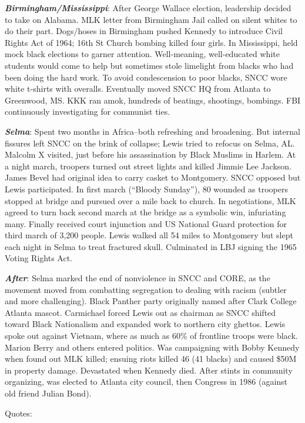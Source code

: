 \documentclass[
]{article}
\begin{document}
\textbf{\emph{Birmingham/Mississippi}}: After George Wallace election,
leadership decided to take on Alabama. MLK letter from Birmingham Jail
called on silent whites to do their part. Dogs/hoses in Birmingham
pushed Kennedy to introduce Civil Rights Act of 1964; 16th St Church
bombing killed four girls. In Mississippi, held mock black elections to
garner attention. Well-meaning, well-educated white students would come
to help but sometimes stole limelight from blacks who had been doing the
hard work. To avoid condescension to poor blacks, SNCC wore white
t-shirts with overalls. Eventually moved SNCC HQ from Atlanta to
Greenwood, MS. KKK ran amok, hundreds of beatings, shootings, bombings.
FBI continuously investigating for communist ties.

\textbf{\emph{Selma}}: Spent two months in Africa--both refreshing and
broadening. But internal fissures left SNCC on the brink of collapse;
Lewis tried to refocus on Selma, AL. Malcolm X visited, just before his
assassination by Black Muslims in Harlem. At a night march, troopers
turned out street lights and killed Jimmie Lee Jackson. James Bevel had
original idea to carry casket to Montgomery. SNCC opposed but Lewis
participated. In first march (``Bloody Sunday''), 80 wounded as troopers
stopped at bridge and pursued over a mile back to church. In
negotiations, MLK agreed to turn back second march at the bridge as a
symbolic win, infuriating many. Finally received court injunction and US
National Guard protection for third march of 3,200 people. Lewis walked
all 54 miles to Montgomery but slept each night in Selma to treat
fractured skull. Culminated in LBJ signing the 1965 Voting Rights Act.

\textbf{\emph{After}}: Selma marked the end of nonviolence in SNCC and
CORE, as the movement moved from combatting segregation to dealing with
racism (subtler and more challenging). Black Panther party originally
named after Clark College Atlanta mascot. Carmichael forced Lewis out as
chairman as SNCC shifted toward Black Nationalism and expanded work to
northern city ghettos. Lewis spoke out against Vietnam, where as much as
60\% of frontline troops were black. Marion Berry and others entered
politics. Was campaigning with Bobby Kennedy when found out MLK killed;
ensuing riots killed 46 (41 blacks) and caused \$50M in property damage.
Devastated when Kennedy died. After stints in community organizing, was
elected to Atlanta city council, then Congress in 1986 (against old
friend Julian Bond).

Quotes:
\end{document}
